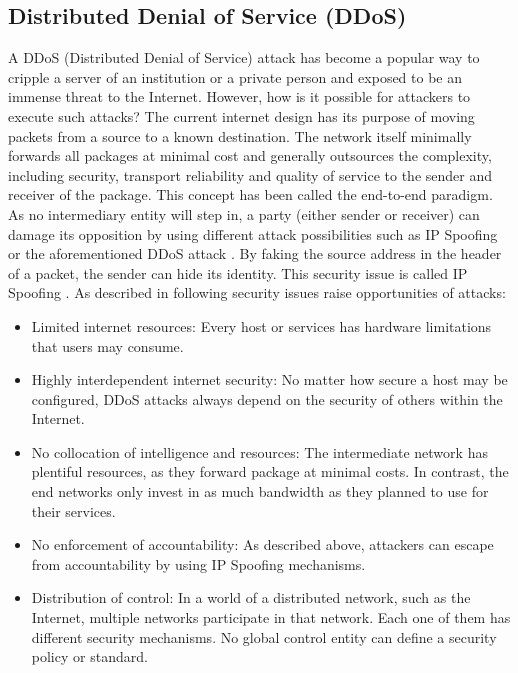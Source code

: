 \subsection{Distributed Denial of Service (DDoS)}
\label{subsec:03_ddos}

A DDoS (Distributed Denial of Service) attack has become a popular way to cripple a server of an institution or a private person and exposed to be an immense threat to the Internet. However, how is it possible for attackers to execute such attacks? The current internet design has its purpose of moving packets from a source to a known destination. The network itself minimally forwards all packages at minimal cost and generally outsources the complexity, including security, transport reliability and quality of service to the sender and receiver of the package. This concept has been called the end-to-end paradigm. As no intermediary entity will step in, a party (either sender or receiver) can damage its opposition by using different attack possibilities such as IP Spoofing or the aforementioned DDoS attack \cite{Mirkovic2004}. By faking the source address in the header of a packet, the sender can hide its identity. This security issue is called IP Spoofing \cite{Cloudflare2019}. As described in \citet{Mirkovic2004} following security issues raise opportunities of attacks:
\begin{itemize}
    \item Limited internet resources: Every host or services has hardware limitations that users may consume.
    \item Highly interdependent internet security: No matter how secure a host may be configured, DDoS attacks always depend on the security of others within the Internet.
    \item No collocation of intelligence and resources: The intermediate network has plentiful resources, as they forward package at minimal costs.  In contrast, the end networks only invest in as much bandwidth as they planned to use for their services.
    \item No enforcement of accountability: As described above, attackers can escape from accountability by using IP Spoofing mechanisms.
    \item Distribution of control: In a world of a distributed network, such as the Internet, multiple networks participate in that network. Each one of them has different security mechanisms. No global control entity can define a security policy or standard.
\end{itemize}

